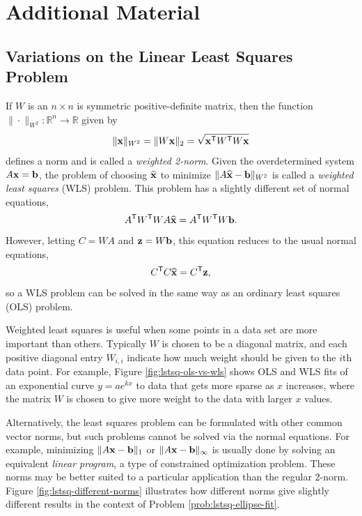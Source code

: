 \newpage

\section*{Additional Material} %

\subsection*{Variations on the Linear Least Squares Problem} %

If $W$ is an $n\times n$ is symmetric positive-definite matrix, then the function $\|\cdot\|_{W^2}:\mathbb{R}^n\rightarrow\mathbb{R}$ given by
\[
\|\mathbf{x}\|_{W^2} = \|W\mathbf{x}\|_2 = \sqrt{\mathbf{x}^{\mathsf T} W^{\mathsf T} W\mathbf{x}}
\]
defines a norm and is called a \emph{weighted 2-norm}.
Given the overdetermined system $A\mathbf{x} = \mathbf{b}$, the problem of choosing $\widehat{\mathbf{x}}$ to minimize $\|A\widehat{\mathbf{x}} - \mathbf{b}\|_{W^2}$ is called a \emph{weighted least squares} (WLS) problem.
This problem has a slightly different set of normal equations,
\[
A^{\mathsf T} W^{\mathsf T} W A \widehat{\mathbf{x}} = A^{\mathsf T} W^{\mathsf T} W \mathbf{b}.
\]
However, letting $C = W A$ and $\mathbf{z} = W \mathbf{b}$, this equation reduces to the usual normal equations,
\[
C^{\mathsf T} C \widehat{\mathbf{x}} = C^{\mathsf T} \mathbf{z},
\]
so a WLS problem can be solved in the same way as an ordinary least squares (OLS) problem.

Weighted least squares is useful when some points in a data set are more important than others.
Typically $W$ is chosen to be a diagonal matrix, and each positive diagonal entry $W_{i,i}$ indicate how much weight should be given to the $i$th data point.
For example, Figure \ref{fig:lstsq-ols-vs-wls} shows OLS and WLS fits of an exponential curve $y = ae^{kx}$ to data that gets more sparse as $x$ increases, where the matrix $W$ is chosen to give more weight to the data with larger $x$ values.

Alternatively, the least squares problem can be formulated with other common vector norms, but such problems cannot be solved via the normal equations.
For example, minimizing $\|A\mathbf{x} - \mathbf{b}\|_1$ or $\|A\mathbf{x} - \mathbf{b}\|_\infty$ is usually done by solving an equivalent \emph{linear program}, a type of constrained optimization problem.
These norms may be better suited to a particular application than the regular $2$-norm.
Figure \ref{fig:lstsq-different-norms} illustrates how different norms give slightly different results in the context of Problem \ref{prob:lstsq-ellipse-fit}.

